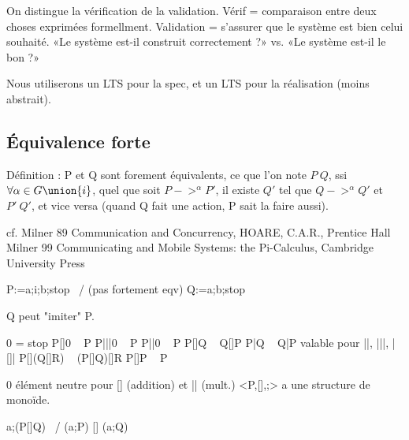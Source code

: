 \documentclass[a4paper,french]{article}
\begin{document}
On distingue la vérification de la validation. Vérif = comparaison entre deux choses exprimées formellment. Validation = s'assurer que le système est bien celui souhaité. «Le système est-il construit correctement ?» vs. «Le système est-il le bon ?»

Nous utiliserons un LTS pour la spec, et un LTS pour la réalisation (moins abstrait).

\subsection{Équivalence forte}%
Définition : P et Q sont forement équivalents, ce que l'on note $P~Q$, ssi $\forall \alpha \in G\union{i}$, quel que soit $P ->^\alpha P'$,
il existe $Q'$ tel que $Q ->^\alpha Q'$ et $P' ~ Q'$, et vice versa (quand Q fait une action, P sait la faire aussi).

cf. Milner 89 Communication and Concurrency, HOARE, C.A.R., Prentice Hall
    Milner 99 Communicating and Mobile Systems: the Pi-Calculus, Cambridge University Press

P:=a;i;b;stop ~/ (pas fortement eqv) Q:=a;b;stop

Q peut "imiter" P.

0 = stop
P[]0 ~ P
P|||0 ~ P
P||0 ~ P
P[]Q ~ Q[]P
P|Q ~ Q|P valable pour ||, |||, |[]|
P[](Q[]R) ~ (P[]Q)[]R
P[]P ~ P

0 élément neutre pour [] (addition) et || (mult.)
<P,[],;> a une structure de monoïde.

a;(P[]Q) ~/ (a;P) [] (a;Q)
\end{document}
